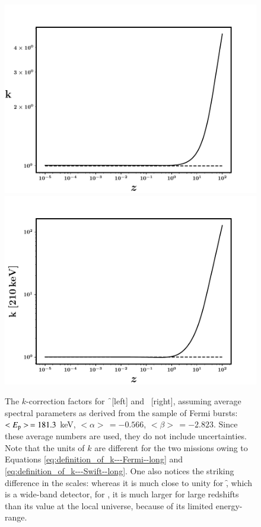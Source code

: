 \begin{figure}
\begin{center}
\includegraphics[scale=0.42]{k_correction--Fermi}
\includegraphics[scale=0.42]{k_correction--Swift}
\caption[$k$-correction factors for \f\ and \s]{The $k$-correction factors for \f\ [left] and \s\ [right], assuming average spectral parameters as derived from the sample of Fermi bursts: $<E_{\rm p}> \, = 181.3$ keV, $<\alpha> \, = -0.566$, $<\beta> \, = -2.823$. Since these average numbers are used, they do not include uncertainties. Note that the units of $k$ are different for the two missions owing to Equations \ref{eq:definition_of_k---Fermi--long} and \ref{eq:definition_of_k---Swift--long}. One also notices the striking difference in the scales: whereas it is much close to unity for \f, which is a wide-band detector, for \s, it is much larger for large redshifts than its value at the local universe, because of its limited energy-range.}
\label{fig:k-correction--long}
\end{center}
\end{figure}

